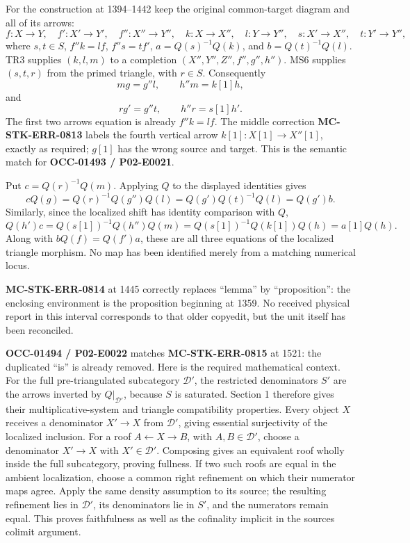 \documentclass[11pt]{article}
\begin{document}
For the construction at 1394–\allowbreak{}1442 keep the original common-target diagram and all of its arrows:\allowbreak{} \[
f:X\to Y,\quad f':X'\to Y',\quad f'':X''\to Y'',\quad
k:X\to X'',\quad l:Y\to Y'',\quad s:X'\to X'',\quad t:Y'\to Y'',
\] where \(s,t\in S\),\allowbreak{} \(f''k=lf\),\allowbreak{} \(f''s=tf'\),\allowbreak{} \(a=Q(s)^{-1}Q(k)\),\allowbreak{} and \(b=Q(t)^{-1}Q(l)\). TR3 supplies \((k,l,m)\) to a completion \((X'',Y'',Z'',f'',g'',h'')\). MS6 supplies \((s,t,r)\) from the primed triangle,\allowbreak{} with \(r\in S\). Consequently \[
mg=g''l,\qquad h''m=k[1]h,
\] and \[
rg'=g''t,\qquad h''r=s[1]h'.
\] The first two arrows\textquotesingle{} equation is already \(f''k=lf\). The middle correction \textbf{MC-STK-ERR-0813} labels the fourth vertical arrow \(k[1]:X[1]\to X''[1]\),\allowbreak{} exactly as required; \(g[1]\) has the wrong source and target. This is the semantic match for \textbf{OCC-01493 /\allowbreak{} P02-E0021}.

Put \(c=Q(r)^{-1}Q(m)\). Applying \(Q\) to the displayed identities gives \[
cQ(g)=Q(r)^{-1}Q(g'')Q(l)=Q(g')Q(t)^{-1}Q(l)=Q(g')b.
\] Similarly,\allowbreak{} since the localized shift has identity comparison with \(Q\),\allowbreak{} \[
Q(h')c=Q(s[1])^{-1}Q(h'')Q(m)
=Q(s[1])^{-1}Q(k[1])Q(h)=a[1]Q(h).
\] Along with \(bQ(f)=Q(f')a\),\allowbreak{} these are all three equations of the localized triangle morphism. No map has been identified merely from a matching numerical locus.

\textbf{MC-STK-ERR-0814} at 1445 correctly replaces ``lemma'' by “proposition”:\allowbreak{} the enclosing environment is the proposition beginning at 1359. No received physical report in this interval corresponds to that older copyedit,\allowbreak{} but the unit itself has been reconciled.

\textbf{OCC-01494 /\allowbreak{} P02-E0022} matches \textbf{MC-STK-ERR-0815} at 1521:\allowbreak{} the duplicated ``is'' is already removed. Here is the required mathematical context. For the full pre-triangulated subcategory \(\mathcal D'\),\allowbreak{} the restricted denominators \(S'\) are the arrows inverted by \(Q|_{\mathcal D'}\),\allowbreak{} because \(S\) is saturated. Section 1 therefore gives their multiplicative-system and triangle compatibility properties. Every object \(X\) receives a denominator \(X'\to X\) from \(\mathcal D'\),\allowbreak{} giving essential surjectivity of the localized inclusion. For a roof \(A\leftarrow X\to B\),\allowbreak{} with \(A,B\in\mathcal D'\),\allowbreak{} choose a denominator \(X'\to X\) with \(X'\in\mathcal D'\). Composing gives an equivalent roof wholly inside the full subcategory,\allowbreak{} proving fullness. If two such roofs are equal in the ambient localization,\allowbreak{} choose a common right refinement on which their numerator maps agree. Apply the same density assumption to its source; the resulting refinement lies in \(\mathcal D'\),\allowbreak{} its denominators lie in \(S'\),\allowbreak{} and the numerators remain equal. This proves faithfulness as well as the cofinality implicit in the source\textquotesingle s colimit argument.
\end{document}

